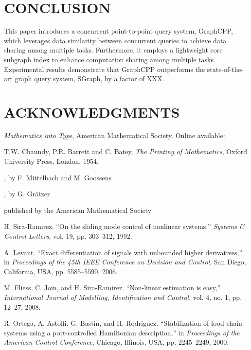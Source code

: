 \documentclass[lettersize,journal]{IEEEtran} %
\begin{document}
\section{CONCLUSION}
This paper introduces a concurrent point-to-point query system, GraphCPP, which leverages data similarity between concurrent queries to achieve data sharing among multiple tasks. Furthermore, it employs a lightweight core subgraph index to enhance computation sharing among multiple tasks. Experimental results demonstrate that GraphCPP outperforms the state-of-the-art graph query system, SGraph, by a factor of XXX.

\section{ACKNOWLEDGMENTS}


\begin{thebibliography}{1} %

{\it{Mathematics into Type}}, American Mathematical Society. Online available:  %

T.W. Chaundy, P.R. Barrett and C. Batey, {\it{The Printing of Mathematics}}, Oxford University Press. London, 1954.

, by F. Mittelbach and M. Goossens

, by G. Gr\"atzer

 published by the American Mathematical Society

H. Sira-Ramirez. ``On the sliding mode control of nonlinear systems,'' \textit{Systems \& Control Letters}, vol. 19, pp. 303--312, 1992.

A. Levant. ``Exact differentiation of signals with unbounded higher derivatives,''  in \textit{Proceedings of the 45th IEEE Conference on Decision and Control}, San Diego, California, USA, pp. 5585--5590, 2006.

M. Fliess, C. Join, and H. Sira-Ramirez. ``Non-linear estimation is easy,'' \textit{International Journal of Modelling, Identification and Control}, vol. 4, no. 1, pp. 12--27, 2008.

R. Ortega, A. Astolfi, G. Bastin, and H. Rodriguez. ``Stabilization of food-chain systems using a port-controlled Hamiltonian description,'' in \textit{Proceedings of the American Control Conference}, Chicago, Illinois, USA, pp. 2245--2249, 2000. %

\end{thebibliography} %
\end{document}
